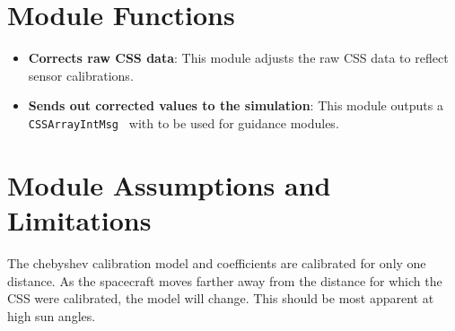 

\section{Module Functions}

\begin{itemize}
	\item \textbf{Corrects raw CSS data}: This module adjusts the raw CSS data to reflect sensor calibrations. 
	\item \textbf{Sends out corrected values to the simulation}: This module outputs a \verb~ CSSArrayIntMsg ~ with to be used for guidance modules.
\end{itemize}

\section{Module Assumptions and Limitations}
The chebyshev calibration model and coefficients are calibrated for only one distance. As the spacecraft moves farther away from the distance for which the CSS were calibrated, the model will change. This should be most apparent at high sun angles.
